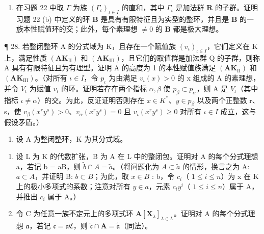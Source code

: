 \begin{enumerate}
\def\labelenumi{\arabic{enumi}.}
\setcounter{enumi}{26}
\tightlist
\item
  在习题 22 中取 \(\Gamma\) 为族 \((\Gamma_{\iota})_{\iota\in I}\) 的直和，其中 \(\Gamma_{\iota}\) 是加法群 \(\mathbf{R}\) 的子群。证明习题 22 (b) 中定义的环 \(\mathbf{B}\) 是具有有限特征且为实型的整环，并且是 \(\mathbf{B}\) 的一族本性赋值环的交；此外，每个素理想 \(\neq 0\) 的 \(\mathbf{B}\) 都是极大理想。
\end{enumerate}

¶ 28. 若整闭整环 A 的分式域为 K，且存在一个赋值族 \((v_{\iota})_{\iota \in I}\)，它们定义在 K 上，满足性质 \((\mathbf{AK}_{\mathrm{II}})\) 和 \((\mathbf{AK}_{\mathrm{III}})\)，且它们的取值群是加法群 Q 的子群，则称 A 具有有限特征且为有理型。证明 A 的高度为 1 的本性赋值族满足 \((\mathbf{AK}_{\mathrm{II}})\) 和 \((\mathbf{AK}_{\mathrm{III}})\)。（对所有 \(\iota \in I\)，令 \(p_{\iota}\) 为由满足 \(v_{\iota}(x) > 0\) 的 x 组成的 A 的素理想，并令 \(V_{\iota}\) 为赋值 \(v_{\iota}\) 的环。证明若存在两个指标 \(\alpha, \beta\) 使 \(p_{\beta} \subset p_{\alpha}\)，则 A 是 \(V_{\iota}\)（其中指标 \(\iota \neq \alpha\)）的交。为此，反证证明否则存在 \(x \in K^{*}\)、\(y \in p_{\beta}\) 以及两个正整数 r、s，使 \(v_{\beta}(x^{r}y^{s}) > 0\)、\(v_{\alpha}(x^{r}y^{s}) = 0\) 且 \(v_{\iota}(x^{r}y^{s}) \geqslant 0\) 对所有 \(\iota \in I\) 成立，这与假设矛盾。）

\begin{enumerate}
\def\labelenumi{\arabic{enumi}.}
\setcounter{enumi}{28}
\tightlist
\item
  设 A 为整闭整环，K 为其分式域。
\end{enumerate}

\begin{enumerate}
\def\labelenumi{(\alph{enumi})}
\item
  设 L 为 K 的代数扩张，B 为 A 在 L 中的整闭包。证明对 A 的每个分式理想 a，若记 b = aB，则 \(\tilde{b} \cap A = \tilde{a}\)。（将问题化为 \(A \subset \tilde{a}\) 的情形，换言之为 A: \(a \subset A\)，并证明 B: \(b \subset B\)；为此，取 \(x \in B\) : b，令 \(c_i\)（ \(1 \leqslant i \leqslant n\)）为 x 在 K 上的极小多项式的系数；注意对所有 \(y \in a\)，元素 \(c_i y^i\)（ \(1 \leqslant i \leqslant n\)）属于 A，并推出 \(c_i\) 属于 A。）
\item
  令 C 为任意一族不定元上的多项式环 \(\mathbf{A}[\mathbf{X}_{\lambda}]_{\lambda \in L}\)。证明对 A 的每个分式理想 \(\mathfrak{a}\)，若记 \(\mathfrak{c} = \mathfrak{aC}\)，则 \(\tilde{\mathfrak{c}} \cap \mathbf{A} = \tilde{\mathfrak{a}}\)（同法）。
\end{enumerate}

